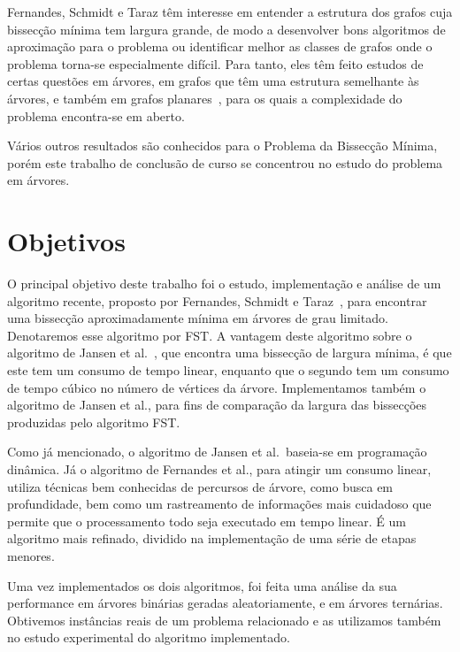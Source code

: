 \documentclass[a4paper,12pt]{article}
\begin{document}
Fernandes, Schmidt e Taraz têm interesse em entender a estrutura 
dos grafos cuja bissecção mínima tem largura grande, de modo a 
desenvolver bons algoritmos de aproximação para o problema ou 
identificar melhor as classes de grafos onde o problema torna-se 
especialmente difícil. 
Para tanto, eles têm feito estudos de certas questões em árvores, 
em grafos que têm uma estrutura semelhante às árvores, e também em 
grafos planares~\cite{FernandesST13,FernandesST15}, para os quais 
a complexidade do problema encontra-se em aberto. 

Vários outros resultados são conhecidos para o Problema da 
Bissecção Mínima, porém este trabalho de conclusão de curso se 
concentrou no estudo do problema em árvores.

\newpage



\section{Objetivos} 

O principal objetivo deste trabalho foi o estudo, implementação e 
análise de um algoritmo recente, proposto por Fernandes, Schmidt e 
Taraz~\cite{FernandesST13}, para encontrar uma bissecção 
aproximadamente mínima em árvores de grau limitado. Denotaremos
esse algoritmo por FST. 
A vantagem deste algoritmo sobre o algoritmo de Jansen et 
al.~\cite{JansenKLS01}, que encontra uma bissecção de largura 
mínima, é que este tem um consumo de tempo linear, enquanto que o 
segundo tem um consumo de tempo cúbico no número de vértices da 
árvore. 
Implementamos também o algoritmo de Jansen et al., para fins de 
comparação da largura das bissecções produzidas pelo algoritmo
FST. 

Como já mencionado, o algoritmo de Jansen et al.\ baseia-se em 
programação dinâmica. 
Já o algoritmo de Fernandes et al., para atingir um consumo 
linear, utiliza técnicas bem conhecidas de percursos de árvore, 
como busca em profundidade, bem como um rastreamento de 
informações mais cuidadoso que permite que o processamento todo 
seja executado em tempo linear. 
É um algoritmo mais refinado, dividido na implementação de uma 
série de etapas menores. 

Uma vez implementados os dois algoritmos, foi feita uma análise 
da sua performance em árvores binárias geradas aleatoriamente, e 
em árvores ternárias.
Obtivemos instâncias reais de um problema relacionado e as 
utilizamos também no estudo experimental do algoritmo implementado.
 
\end{document}
